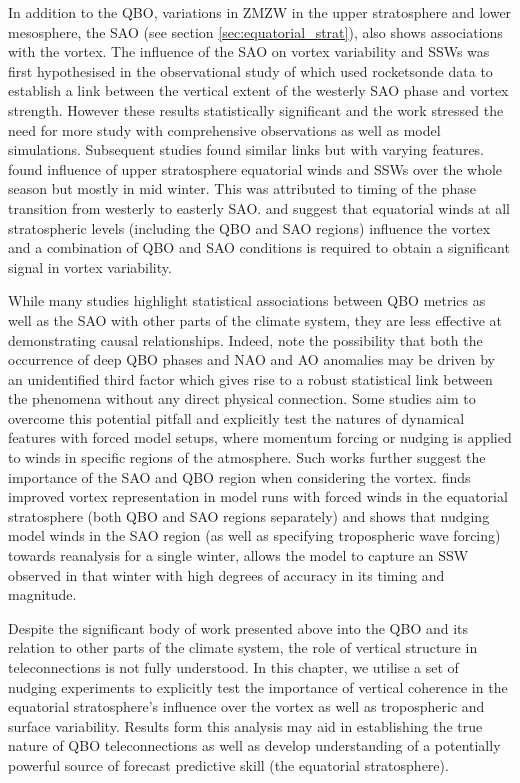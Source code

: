 In addition to the QBO, variations in ZMZW in the upper stratosphere and lower mesosphere, the SAO (see section \ref{sec:equatorial_strat}), also shows associations with the vortex. The influence of the SAO on vortex variability and SSWs was first hypothesised in the observational study of \cite{JGray2001} which used rocketsonde data to establish a link between the vertical extent of the westerly SAO phase and vortex strength. However these results statistically significant and the work stressed the need for more study with comprehensive observations as well as model simulations. Subsequent studies found similar links but with varying features. \cite{Gray2003} found influence of upper stratosphere equatorial winds and SSWs over the whole season but mostly in mid winter. This was attributed to timing of the phase transition from westerly to easterly SAO. \cite{JGray2001} and \cite{Hamilton} suggest that equatorial winds at all stratospheric levels (including the QBO and SAO regions) influence the vortex and a combination of QBO and SAO conditions is required to obtain a significant signal in vortex variability.

While many studies highlight statistical associations between QBO metrics as well as the SAO with other parts of the climate system, they are less effective at demonstrating causal relationships. Indeed, \cite{andrewsObserved2019} note the possibility that both the occurrence of deep QBO phases and NAO and AO anomalies may be driven by an unidentified third factor which gives rise to a robust statistical link between the phenomena without any direct physical connection. Some studies aim to overcome this potential pitfall and explicitly test the natures of dynamical features with forced model setups, where momentum forcing or nudging is applied to winds in specific regions of the atmosphere. Such works further suggest the importance of the SAO and QBO region when considering the vortex. \cite{Pascoe2005} finds improved vortex representation in model runs with forced winds in the equatorial stratosphere (both QBO and SAO regions separately) and \cite{Brown2019} shows that nudging model winds in the SAO region (as well as specifying tropospheric wave forcing) towards reanalysis for a single winter, allows the model to capture an SSW observed in that winter with high degrees of accuracy in its timing and magnitude.   

Despite the significant body of work presented above into the QBO and its relation to other parts of the climate system, the role of vertical structure in teleconnections is not fully understood. In this chapter, we utilise a set of nudging experiments to explicitly test the importance of vertical coherence in the equatorial stratosphere's influence over the vortex as well as tropospheric and surface variability. Results form this analysis may aid in establishing the true nature of QBO teleconnections as well as develop understanding of a potentially powerful source of forecast predictive skill (the equatorial stratosphere).

